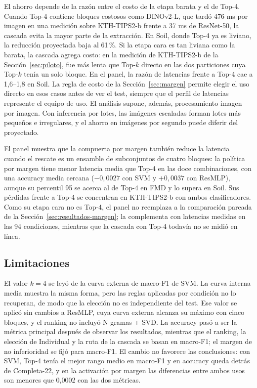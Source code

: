 \documentclass[a4paper,fleqn]{cas-sc}
\begin{document}
El ahorro depende de la razón entre el costo de la etapa barata y el de Top-4. Cuando Top-4 contiene bloques costosos como DINOv2-L, que tardó 476 ms por imagen en una medición sobre KTH-TIPS2-b frente a 37 ms de ResNet-50, la cascada evita la mayor parte de la extracción. En Soil, donde Top-4 ya es liviano, la reducción proyectada baja al 61\,\%. Si la etapa cara es tan liviana como la barata, la cascada agrega costo: en la medición de KTH-TIPS2-b de la Sección~\ref{sec:piloto}, fue más lenta que Top-$k$ directo en las dos particiones cuya Top-$k$ tenía un solo bloque. En el panel, la razón de latencias frente a Top-4 cae a 1,6--1,8 en Soil. La regla de costo de la Sección~\ref{sec:margen} permite elegir el uso directo en esos casos antes de ver el test, siempre que el perfil de latencias represente el equipo de uso. El análisis supone, además, procesamiento imagen por imagen. Con inferencia por lotes, las imágenes escaladas forman lotes más pequeños e irregulares, y el ahorro en imágenes por segundo puede diferir del proyectado.

El panel muestra que la compuerta por margen también reduce la latencia cuando el rescate es un ensamble de subconjuntos de cuatro bloques: la política por margen tiene menor latencia media que Top-4 en las doce combinaciones, con una accuracy media cercana ($-0{,}0027$ con SVM y $+0{,}0037$ con ResMLP), aunque su percentil 95 se acerca al de Top-4 en FMD y lo supera en Soil. Sus pérdidas frente a Top-4 se concentran en KTH-TIPS2-b con ambos clasificadores. Como su etapa cara no es Top-4, el panel no reemplaza a la comparación pareada de la Sección~\ref{sec:resultados-margen}; la complementa con latencias medidas en las 94 condiciones, mientras que la cascada con Top-4 todavía no se midió en línea.

\subsection{Limitaciones}

El valor $k=4$ se leyó de la curva externa de macro-F1 de SVM. La curva interna media muestra la misma forma, pero las reglas aplicadas por condición no lo recuperan, de modo que la elección no es independiente del test. Ese valor se aplicó sin cambios a ResMLP, cuya curva externa alcanza su máximo con cinco bloques, y el ranking no incluyó N-gramas + SVD. La accuracy pasó a ser la métrica principal después de observar los resultados, mientras que el ranking, la elección de Individual y la ruta de la cascada se basan en macro-F1; el margen de no inferioridad se fijó para macro-F1. El cambio no favorece las conclusiones: con SVM, Top-4 tenía el mejor rango medio en macro-F1 y en accuracy queda detrás de Completa-22, y en la activación por margen las diferencias entre ambos usos son menores que 0,0002 con las dos métricas.
\end{document}
